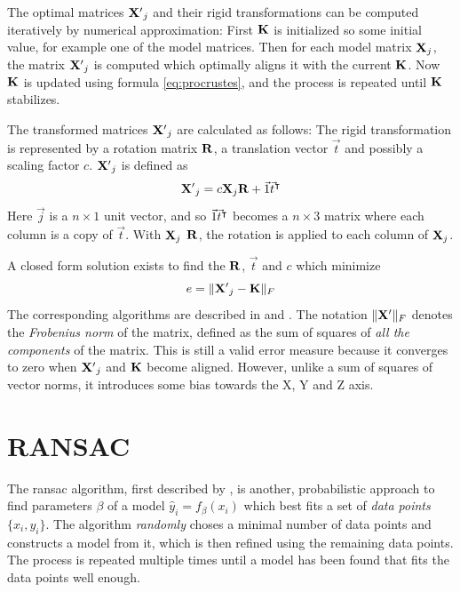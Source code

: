 The optimal matrices $\mathbf{X'}_j$ and their rigid transformations can be computed iteratively by numerical approximation: \cite{Tild2010} First $\mathbf{K}$ is initialized so some initial value, for example one of the model matrices. Then for each model matrix $\mathbf{X}_j$, the matrix $\mathbf{X'}_j$ is computed which optimally aligns it with the current $\mathbf{K}$. Now $\mathbf{K}$ is updated using formula \ref{eq:procrustes}, and the process is repeated until $\mathbf{K}$ stabilizes.

The transformed matrices $\mathbf{X'}_j$ are calculated as follows: The rigid transformation is represented by a rotation matrix $\mathbf{R}$, a translation vector $\vec{t}$ and possibly a scaling factor $c$. $\mathbf{X'}_j$ is defined as
\begin{equation}
\mathbf{X'}_j = c \mathbf{X}_j \mathbf{R} + \vec{1} \vec{t}^\intercal
\end{equation}
Here $\vec{j}$ is a $n \times 1$ unit vector, and so $\vec{1} \vec{t}^\intercal$ becomes a $n \times 3$ matrix where each column is a copy of $\vec{t}$. With $\mathbf{X}_j$ $\mathbf{R}$, the rotation is applied to each column of $\mathbf{X}_j$.

A closed form solution exists to find the $\mathbf{R}$, $\vec{t}$ and $c$ which minimize
\begin{equation}
e = \| \mathbf{X'}_j - \mathbf{K} \|_{F}
\end{equation} 
The corresponding algorithms are described in \cite{Scho1970} and \cite{Scho1966}. The notation $\| \mathbf{X'} \|_{F}$ denotes the \emph{Frobenius norm} of the matrix, defined as the sum of squares of \emph{all the components} of the matrix. This is still a valid error measure because it converges to zero when $\mathbf{X'}_j$ and $\mathbf{K}$ become aligned. However, unlike a sum of squares of vector norms, it introduces some bias towards the X, Y and Z axis.


\section{RANSAC}
The \gls{ransac} algorithm, first described by \cite{Fisc1980}, is another, probabilistic approach to find parameters $\beta$ of a model $\hat{y}_i = f_\beta(x_i)$ which best fits a set of \emph{data points} $\{ x_i, y_i \}$. The algorithm \emph{randomly} choses a minimal number of data points and constructs a model from it, which is then refined using the remaining data points. The process is repeated multiple times until a model has been found that fits the data points well enough.


